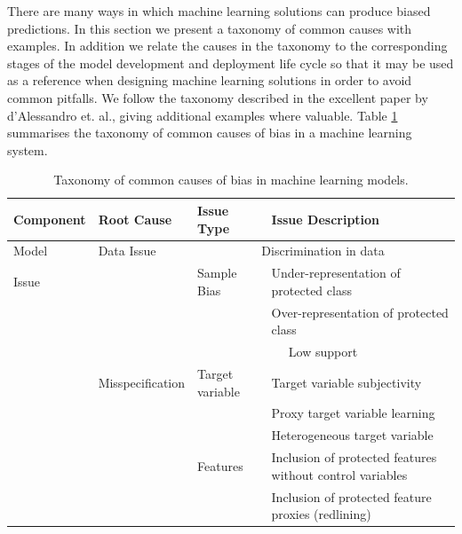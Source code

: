 There are many ways in which machine learning solutions can produce biased predictions. In this section we present a taxonomy of common causes with examples. In addition we relate the causes in the taxonomy to the corresponding stages of the model development and deployment life cycle so that it may be used as a reference when designing machine learning solutions in order to avoid common pitfalls. We follow the taxonomy described in the excellent paper by d'Alessandro et. al.\cite{}, giving additional examples where valuable. Table \ref{tab_Taxonomy} summarises the taxonomy of common causes of bias in a machine learning system.
%
\begin{table}[h!]
\caption[Taxonomy of common causes of bias in machine learning models.]{Taxonomy of common causes of bias in machine learning models\cite{ConsClfn}.}
\label{tab_Taxonomy}
\centering
\vspace{10pt}
\begin{tabular}{|l|l|l|l|}
\hline
Component & Root Cause          & Issue Type      & Issue Description                                         \\
\hline
\hline
Model     & Data Issue          & \multicolumn{2}{c|}{Discrimination in data}                                 \\
\cline{3-4}
Issue     &                     & Sample Bias     & Under-representation of protected class                   \\
\cline{4-4}
          &                     &                 & Over-representation of protected class                    \\
\cline{3-4}
          &                     & \multicolumn{2}{c|}{Low support}                                            \\
\cline{2-4}
          & Misspecification    & Target variable & Target variable subjectivity                              \\
\cline{4-4}
          &                     &                 & Proxy target variable learning                            \\
\cline{4-4}
          &                     &                 & Heterogeneous target variable                             \\
\cline{3-4}
          &                     & Features        & Inclusion of protected features without control variables \\
\cline{4-4}
          &                     &                 & Inclusion of protected feature proxies (redlining)        \\

\end{tabular}
\end{table}
